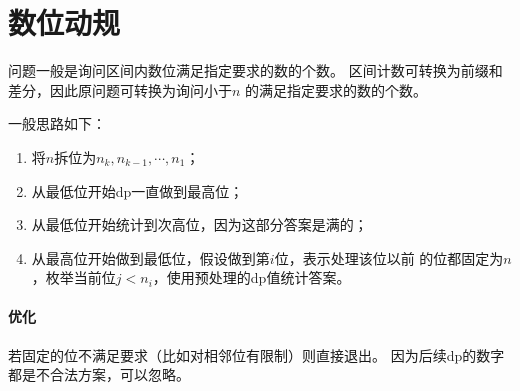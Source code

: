 \section{数位动规}
问题一般是询问区间内数位满足指定要求的数的个数。
区间计数可转换为前缀和差分，因此原问题可转换为询问小于$n$
的满足指定要求的数的个数。

一般思路如下：
\begin{enumerate}
	\item 将$n$拆位为$n_k,n_{k-1},\cdots,n_1$；
	\item 从最低位开始dp一直做到最高位；
	\item 从最低位开始统计到次高位，因为这部分答案是满的；
	\item 从最高位开始做到最低位，假设做到第$i$位，表示处理该位以前
	      的位都固定为$n$，枚举当前位$j<n_i$，使用预处理的dp值统计答案。
\end{enumerate}

\paragraph{优化} 若固定的位不满足要求（比如对相邻位有限制）则直接退出。
因为后续dp的数字都是不合法方案，可以忽略。
